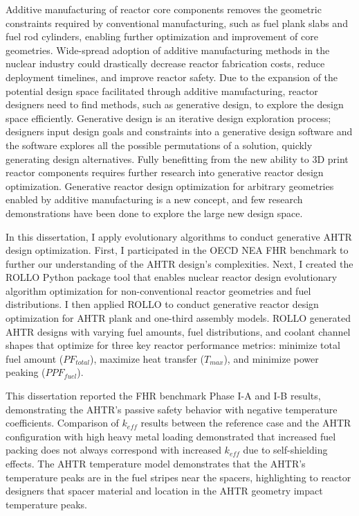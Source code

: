 
Additive manufacturing of reactor core components removes the geometric constraints
required by conventional manufacturing, such as fuel plank slabs and fuel rod 
cylinders, enabling further optimization and improvement of core geometries. 
Wide-spread adoption of additive manufacturing methods in the nuclear industry 
could drastically decrease reactor fabrication costs, reduce deployment timelines, 
and improve reactor safety. 
Due to the expansion of the potential design space facilitated through additive 
manufacturing, reactor designers need to find methods, such as generative 
design, to explore the design space efficiently.
Generative design is an iterative design exploration process; designers input design 
goals and constraints into a generative design software and the software explores 
all the possible permutations of a solution, quickly generating design alternatives. 
Fully benefitting from the new ability to 3D print reactor components requires further 
research into generative reactor design optimization.  
Generative reactor design optimization for arbitrary geometries enabled by additive 
manufacturing is a new concept, and few research demonstrations have been done to 
explore the large new design space. 

In this dissertation, I apply evolutionary algorithms to conduct generative \gls{AHTR} 
design optimization. 
First, I participated in the \gls{OECD} \gls{NEA} \gls{FHR} benchmark to further our 
understanding of the \gls{AHTR} design's complexities.  
Next, I created the \gls{ROLLO} Python package tool that enables nuclear reactor design 
evolutionary algorithm optimization for non-conventional reactor geometries and fuel 
distributions. 
I then applied \gls{ROLLO} to conduct generative reactor design optimization
for \gls{AHTR} plank and one-third assembly models.
\gls{ROLLO} generated \gls{AHTR} designs with varying fuel amounts, fuel 
distributions, and coolant channel shapes that optimize for three key reactor 
performance metrics: minimize total fuel amount ($PF_{total}$), maximize heat 
transfer ($T_{max}$), and minimize power peaking ($PPF_{fuel}$).

This dissertation reported the \gls{FHR} benchmark Phase I-A and I-B results, 
demonstrating the \gls{AHTR}'s passive safety behavior with 
negative temperature coefficients.
Comparison of $k_{eff}$ results between the reference case and the \gls{AHTR} 
configuration with high heavy metal loading demonstrated that increased fuel 
packing does not always correspond with increased $k_{eff}$ due to self-shielding 
effects.
The \gls{AHTR} temperature model demonstrates that the \gls{AHTR}'s temperature peaks 
are in the fuel stripes near the spacers, highlighting to reactor designers that 
spacer material and location in the \gls{AHTR} geometry impact temperature peaks. 

